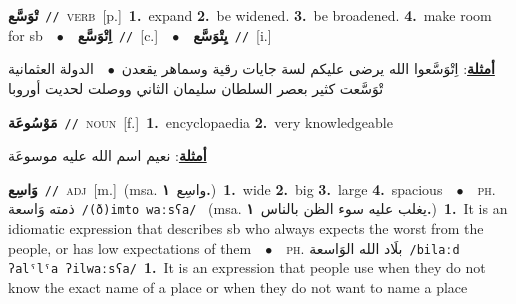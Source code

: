 \documentclass[10pt,a4paper,twoside]{article} %
\begin{document}
\begin{multicols}{2}
{\setlength\topsep{0pt}\textbf{\foreignlanguage{arabic}{تْوَسَّع}}\ {\color{gray}\texttt{//}\color{black}}\ \textsc{verb}\ [p.]\ \textbf{1.}~expand  \textbf{2.}~be widened.  \textbf{3.}~be broadened.  \textbf{4.}~make room for sb\ \ $\bullet$\ \ \setlength\topsep{0pt}\textbf{\foreignlanguage{arabic}{اِتْوَسَّع}}\ {\color{gray}\texttt{//}\color{black}}\ [c.]\ \ $\bullet$\ \ \setlength\topsep{0pt}\textbf{\foreignlanguage{arabic}{يِتْوَسَّع}}\ {\color{gray}\texttt{//}\color{black}}\ [i.]\  \begin{flushright}\color{gray}\foreignlanguage{arabic}{\textbf{\underline{\foreignlanguage{arabic}{أمثلة}}}: اِتْوَسَّعوا الله يرضى عليكم لسة جايات رقية وسماهر يقعدن\ $\bullet$\ \  الدولة العثمانية تْوَسَّعت كثير بعصر السلطان سليمان الثاني ووصلت لحديت أوروبا}\end{flushright}\color{black}} \vspace{2mm}

{\setlength\topsep{0pt}\textbf{\foreignlanguage{arabic}{مَوْسُوعَة}}\ {\color{gray}\texttt{//}\color{black}}\ \textsc{noun}\ [f.]\ \textbf{1.}~encyclopaedia  \textbf{2.}~very knowledgeable\  \begin{flushright}\color{gray}\foreignlanguage{arabic}{\textbf{\underline{\foreignlanguage{arabic}{أمثلة}}}: نعيم اسم الله عليه موسوعَة}\end{flushright}\color{black}} \vspace{2mm}

{\setlength\topsep{0pt}\textbf{\foreignlanguage{arabic}{وَاسِع}}\ {\color{gray}\texttt{//}\color{black}}\ \textsc{adj}\ [m.]\ \color{gray}(msa. \foreignlanguage{arabic}{واسِع}~\foreignlanguage{arabic}{\textbf{١.}})\color{black}\ \textbf{1.}~wide  \textbf{2.}~big  \textbf{3.}~large  \textbf{4.}~spacious\ \ $\bullet$\ \ \textsc{ph.} \color{gray} \foreignlanguage{arabic}{ذمته وَاسعة}\color{black}\ {\color{gray}\texttt{/{\sffamily (ð)imto waːsʕa}/}\color{black}}\ \color{gray} (msa. \foreignlanguage{arabic}{يغلب عليه سوء الظن بالناس}~\foreignlanguage{arabic}{\textbf{١.}})\color{black}\ \textbf{1.}~It is an idiomatic expression that describes sb who always expects the worst from the people, or has low expectations of them\ \ $\bullet$\ \ \textsc{ph.} \color{gray} \foreignlanguage{arabic}{بلَاد الله الوَاسعة}\color{black}\ {\color{gray}\texttt{/{\sffamily bilaːd ʔalˤlˤa ʔilwaːsʕa}/}\color{black}}\ \textbf{1.}~It is an expression that people use when they do not know the exact name of a place or when they do not want to name a place\ } \vspace{2mm}


\end{multicols}
\end{document}
